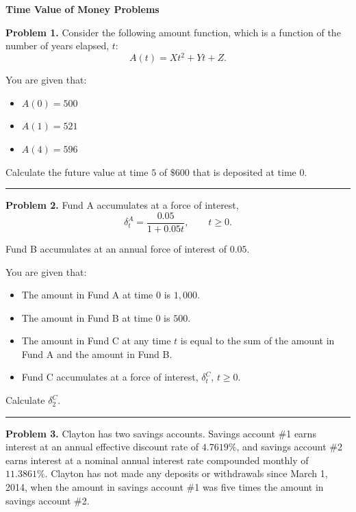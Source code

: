 \documentclass[11pt]{article}
\begin{document}
\begin{center}
    {\Large \textbf{Time Value of Money Problems}}\\
\end{center}

\vspace{10pt}

\textbf{Problem 1.} Consider the following amount function, which is a function of the number of years elapsed, $t$:
\[
A(t) = Xt^{2} + Yt + Z.
\]

You are given that:
\begin{itemize}[leftmargin=2em]
    \item $A(0) = 500$
    \item $A(1) = 521$
    \item $A(4) = 596$
\end{itemize}

Calculate the future value at time $5$ of \(\$600\) that is deposited at time \(0\).

\medskip

\hrule

\medskip


\textbf{Problem 2.} Fund A accumulates at a force of interest,
\[
\delta_t^{A} = \frac{0.05}{1 + 0.05t}, \qquad t \ge 0.
\]

Fund B accumulates at an annual force of interest of $0.05$.

You are given that:
\begin{itemize}[leftmargin=2em]
    \item The amount in Fund A at time $0$ is $1{,}000$.
    \item The amount in Fund B at time $0$ is $500$.
    \item The amount in Fund C at any time $t$ is equal to the sum of the amount in Fund A and the amount in Fund B.
    \item Fund C accumulates at a force of interest, $\delta_t^{C}$, $t \ge 0$.
\end{itemize}

Calculate $\delta_2^{C}$.

\medskip

\hrule

\medskip


\textbf{Problem 3.} Clayton has two savings accounts. Savings account \#1 earns interest at an annual effective discount rate of $4.7619\%$, and savings account \#2 earns interest at a nominal annual interest rate compounded monthly of $11.3861\%$. Clayton has not made any deposits or withdrawals since March 1, 2014, when the amount in savings account \#1 was five times the amount in savings account \#2.
\end{document}
